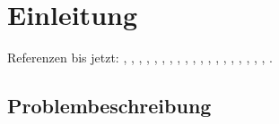 \chapter{Einleitung}\label{ch:einleitung}
Referenzen bis jetzt: \cite{Agarwal2006}, \cite{Ahlgren2012}, \cite{Bayardo2007}, \cite{Broder2004}, \cite{Byers2002}, \cite{Duerr2010}, \cite{Hellerstein1994}, \cite{Lehman1986}, \cite{Nafe2005}, \cite{Qiao2014}, \cite{Ruppel2014}, \cite{Sarwat2012}, \cite{Schnell2013}, \cite{Schoenfeld2014}, \cite{Shiraki2009}, \cite{Werner2015}, \cite{Yang2002}, \cite{Zhang2012}, \cite{Zhu2004}, \cite{Jannink1995}.
\section{Problembeschreibung}\label{sec:problem}
